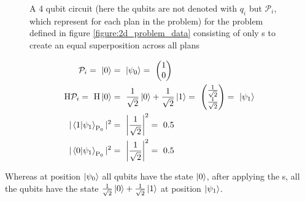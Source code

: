 \begin{figure}[!h]
    \centering
    \caption{A 4 qubit circuit (here the qubits are not denoted with $q_i$ but $\mathcal{P}_i$, which represent for each plan in the problem) for the problem defined in figure \ref{figure:2d_problem_data} consisting of only \hgate s to create an equal superposition across all plans}
    \label{figure:4_qubit_circuit_with_h_gates}
\end{figure}

\begin{equation}
    \centering
    \begin{split}
        \mathcal{P}_i =\ \ket{0} &=\ \ket{\psi_0} =\ \begin{pmatrix}1 \\ 0\end{pmatrix}\\
        \mathrm{H}\mathcal{P}_i =\ \mathrm{H}\ket{0} &=\ \frac{1}{\sqrt{2}}\ket{0} + \frac{1}{\sqrt{2}}\ket{1} =\ \begin{pmatrix}\frac{1}{\sqrt{2}} \\ \frac{1}{\sqrt{2}}\end{pmatrix} =\ \ket{\psi_1}\\
        |\bra{1}\ket{\psi_1}_{\mathrm{P}_0}|^2 &=\ \left|\frac{1}{\sqrt{2}}\right|^2 =\ 0.5\\
        |\bra{0}\ket{\psi_1}_{\mathrm{P}_0}|^2 &=\ \left|\frac{1}{\sqrt{2}}\right|^2 =\ 0.5\\
    \end{split}
    \label{equation:2d_problem_state_0_1}
\end{equation}

Whereas at position $\ket{\psi_0}$ all qubits have the state $\ket{0}$, after applying the \hgate s, all the qubits have the state $\frac{1}{\sqrt{2}}\ket{0} + \frac{1}{\sqrt{2}}\ket{1}$ at position $\ket{\psi_1}$.

